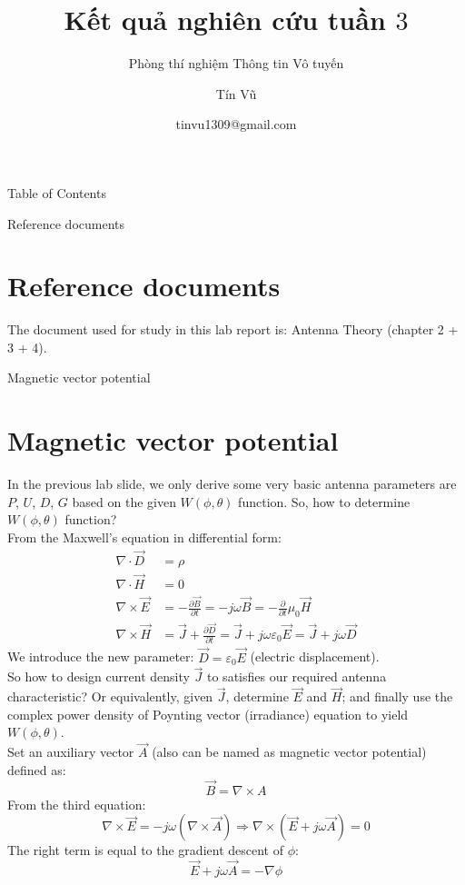 \documentclass[8pt]{beamer}
\title[Kết quả nghiên cứu tuần 3]
{Kết quả nghiên cứu tuần $3$}
\subtitle{Phòng thí nghiệm Thông tin Vô tuyến}
\author[Phòng thí nghiệm thông tin Vô tuyến]
{Tín Vũ}
\date[VLC 2021] %
{tinvu1309@gmail.com}
\begin{document}
\frame{\titlepage}
\begin{frame}{Table of Contents}
\tableofcontents
\end{frame}
\begin{frame}{Reference documents}
\section{Reference documents}
The document used for study in this lab report is: Antenna Theory (chapter 2 + 3 + 4).
\end{frame}
\begin{frame}{Magnetic vector potential}
\section{Magnetic vector potential}
In the previous lab slide, we only derive some very basic antenna parameters are $P$, $U$, $D$, $G$ based on 
the given $W(\phi,\theta)$ function. So, how to determine $W(\phi,\theta)$ function?
\\ From the Maxwell's equation in differential form:
\begin{equation*}
\begin{split}
\nabla\cdot\vec{D}&=\rho\\
\nabla\cdot\vec{H}&=0\\
\nabla\times\vec{E}&=-\frac{\partial \vec{B}}{\partial t}=-j\omega \vec{B}=-\frac{\partial}{\partial t} \mu_{0}\vec{H}\\
\nabla\times\vec{H}&=\vec{J}+\frac{\partial \vec{D}}{\partial t}=\vec{J}+j\omega \varepsilon_{0}\vec{E}=\vec{J}+j\omega\vec{D}
\end{split}
\end{equation*}
We introduce the new parameter: $\vec{D}=\varepsilon_{0}\vec{E}$ (electric displacement).
\\ So how to design current density $\vec{J}$ to satisfies our required antenna characteristic? Or equivalently, given $\vec{J}$,
determine $\vec{E}$ and $\vec{H}$; and finally use the complex power density of Poynting vector (irradiance) equation to yield $W(\phi,\theta)$.
\\ Set an auxiliary vector $\vec{A}$ (also can be named as magnetic vector potential) defined as:
$$\vec{B}=\nabla \times A$$
From the third equation:
$$\nabla\times\vec{E}=-j\omega(\nabla\times\vec{A})\Rightarrow \nabla\times(\vec{E}+j\omega\vec{A})=0$$
The right term is equal to the gradient descent of $\phi$: $$\vec{E}+j\omega\vec{A}=-\nabla \phi$$
\end{frame}
\end{document}
